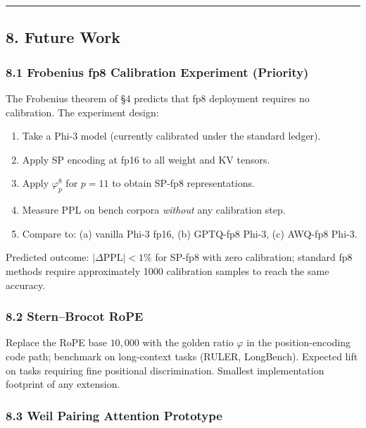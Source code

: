 \documentclass[
  11pt,
]{article}
\providecommand{\tightlist}{%
  \setlength{\itemsep}{0pt}\setlength{\parskip}{0pt}}
\begin{document}
\begin{center}\rule{0.5\linewidth}{0.5pt}\end{center}

\hypertarget{future-work}{%
\subsection{8. Future Work}\label{future-work}}

\hypertarget{frobenius-fp8-calibration-experiment-priority}{%
\subsubsection{8.1 Frobenius fp8 Calibration Experiment
(Priority)}\label{frobenius-fp8-calibration-experiment-priority}}

The Frobenius theorem of §4 predicts that fp8 deployment requires no
calibration. The experiment design:

\begin{enumerate}
\def\labelenumi{\arabic{enumi}.}
\tightlist
\item
  Take a Phi-3 model (currently calibrated under the standard ledger).
\item
  Apply SP encoding at fp16 to all weight and KV tensors.
\item
  Apply \(\varphi_p^8\) for \(p = 11\) to obtain SP-fp8 representations.
\item
  Measure PPL on bench corpora \emph{without} any calibration step.
\item
  Compare to: (a) vanilla Phi-3 fp16, (b) GPTQ-fp8 Phi-3, (c) AWQ-fp8
  Phi-3.
\end{enumerate}

Predicted outcome: \(|\Delta\mathrm{PPL}| < 1\%\) for SP-fp8 with zero
calibration; standard fp8 methods require approximately 1000 calibration
samples to reach the same accuracy.

\hypertarget{sternbrocot-rope}{%
\subsubsection{8.2 Stern--Brocot RoPE}\label{sternbrocot-rope}}

Replace the RoPE base \(10{,}000\) with the golden ratio \(\varphi\) in
the position-encoding code path; benchmark on long-context tasks (RULER,
LongBench). Expected lift on tasks requiring fine positional
discrimination. Smallest implementation footprint of any extension.

\hypertarget{weil-pairing-attention-prototype}{%
\subsubsection{8.3 Weil Pairing Attention
Prototype}\label{weil-pairing-attention-prototype}}
\end{document}
